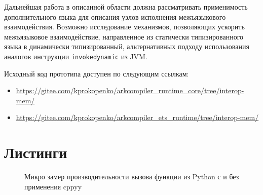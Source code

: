 \documentclass[times
]{itmo-student-thesis}
\begin{document}
Дальнейшая работа в описанной области должна рассматривать применимость дополнительного языка для описания узлов исполнения межъязыкового взаимодействия. Возможно исследование механизмов, позволяющих ускорить межъязыковое взаимодействие, направленное из статически типизированного языка в динамически типизированный, альтернативных подходу использования аналогов инструкции \texttt{invokedynamic} из JVM.

Исходный код прототипа доступен по следующим ссылкам:
\begin{itemize}
	\item \url{https://gitee.com/kprokopenko/arkcompiler_runtime_core/tree/interop-mem/}
	\item \url{https://gitee.com/kprokopenko/arkcompiler_ets_runtime/tree/interop-mem/}
\end{itemize}

\printmainbibliography
\appendix

\chapter{Листинги}
\begin{figure}[!h]
	\caption{Микро замер производительности вызова функции из Python с и без применения cppyy}\label{apx:cppyy-bench}
	
\end{figure}
\end{document}
